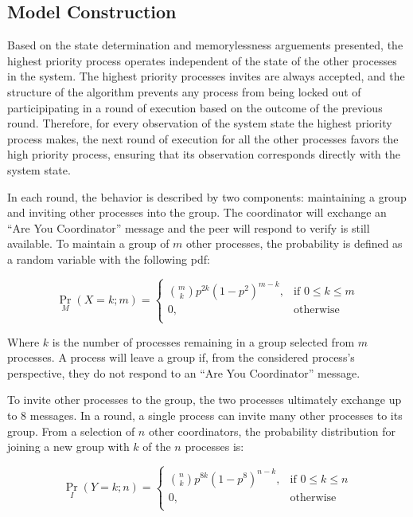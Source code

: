 \subsection{Model Construction}

Based on the state determination and memorylessness arguements presented, the highest priority process operates independent of the state of the other processes in the system.
The highest priority processes invites are always accepted, and the structure of the algorithm prevents any process from being locked out of participipating in a round of execution based on the outcome of the previous round.
Therefore, for every observation of the system state the highest priority process makes, the next round of execution for all the other processes favors the high priority process, ensuring that its observation corresponds directly with the system state.

In each round, the behavior is described by two components: maintaining a group and inviting other processes into the group.
The coordinator will exchange an ``Are You Coordinator'' message and the peer will respond to verify is still available.
To maintain a group of $m$ other processes, the probability is defined as a random variable with the following \ac{pdf}:

\begin{equation}
 \Pr_{M}(X=k; m) =
   \begin{cases}
    \binom{m}{k} p^{2k}(1-p^2)^{m-k}, & \text{if } 0 \leq k \leq m \\
    0,                                & \text{otherwise} \\
  \end{cases}
\end{equation}

Where $k$ is the number of processes remaining in a group selected from $m$ processes.
A process will leave a group if, from the considered process's perspective, they do not respond to an ``Are You Coordinator'' message.

To invite other processes to the group, the two processes ultimately exchange up to 8 messages.
In a round, a single process can invite many other processes to its group.
From a selection of $n$ other coordinators, the probability distribution for joining a new group with $k$ of the $n$ processes is:

\begin{equation}
    \Pr_{I}(Y=k; n) =
    \begin{cases}
        \binom{n}{k} p^{8k}(1-p^8)^{n-k}, & \text{if } 0 \leq k \leq n \\
        0,                                & \text{otherwise} \\
    \end{cases}
\end{equation}

